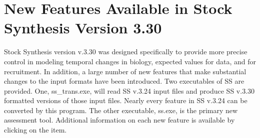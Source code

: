 \section{New Features Available in Stock Synthesis Version 3.30}

Stock Synthesis version v.3.30 was designed specifically to provide more precise control in modeling temporal changes in biology, expected values for data, and for recruitment.  In addition, a large number of new features that make substantial changes to the input formats have been introduced.  Two executables of SS are provided.  One, ss\_trans.exe, will read SS v.3.24 input files and produce SS v.3.30 formatted versions of those input files.  Nearly every feature in SS v.3.24 can be converted by this program.  The other executable, ss.exe, is the primary new assessment tool. Additional information on each new feature is available by clicking on the item.

